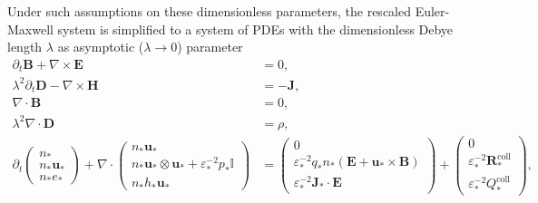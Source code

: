 \documentclass{article}
\begin{document}
Under such assumptions on these dimensionless parameters, the rescaled Euler-Maxwell system is simplified to a system of PDEs with the dimensionless Debye length $\lambda$ as asymptotic ($\lambda \rightarrow 0$) parameter
\begin{subequations}
\begin{align}
    \partial_t \mathbf{B} + \nabla \times \mathbf{E} &= 0, \label{equ:maxwell_faraday_rescaled} \\ 
    \lambda^2 \partial_t \mathbf{D} - \nabla \times \mathbf{H} &= - \mathbf{J}, \label{equ:maxwell_ampere_rescaled} \\
    \nabla \cdot \mathbf{B} &= 0,  \label{equ:maxwell_gauss_B_rescaled}\\
    \lambda^2 \nabla \cdot \mathbf{D} &= \rho, \label{equ:maxwell_gauss_D_rescaled} \\
    \partial_t
    \begin{pmatrix}
    n_* \\
    n_* \mathbf{u}_* \\
    n_* e_*
    \end{pmatrix}
    + \nabla \cdot
    \begin{pmatrix}
    n_* \mathbf{u}_* \\
    n_* \mathbf{u}_* \otimes \mathbf{u}_* + \varepsilon_*^{-2} p_*\mathbb{I} \\
    n_* h_* \mathbf{u}_*
    \end{pmatrix}
    &=
    \begin{pmatrix}
    0 \\
    \varepsilon_*^{-2} q_* n_* (\mathbf{E} + \mathbf{u}_* \times \mathbf{B}) \\
    \varepsilon_*^{-2} \mathbf{J}_* \cdot \mathbf{E}
    \end{pmatrix}+
    \begin{pmatrix}
    0 \\
    \varepsilon_*^{-2}\mathbf{R}_*^{\text{coll}} \\
    \varepsilon_*^{-2}Q_*^{\text{coll}} 
    \end{pmatrix}, \label{equ:euler_rescaled}
\end{align}


\end{subequations}
\end{document}
